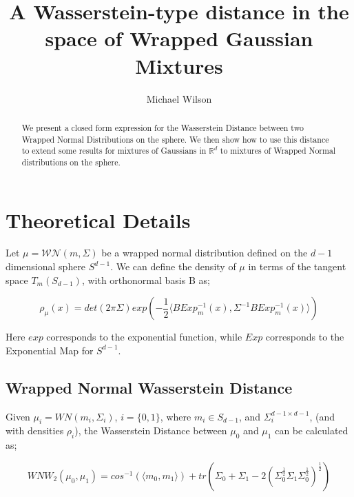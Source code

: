 \documentclass[]{article}
\title{A Wasserstein-type distance in the space of Wrapped Gaussian Mixtures}
\author{Michael Wilson}
\date{}
\begin{document}
	
	\maketitle
	
	\begin{abstract}
	We present a closed form expression for the Wasserstein Distance between two Wrapped Normal Distributions on the sphere. We then show how to use this distance to extend some results for mixtures of Gaussians in $\mathbb{R}^d$ to mixtures of Wrapped Normal distributions on the sphere.  
	\end{abstract}


\section{Theoretical Details}

Let $\mu = \mathcal{WN}(m,\Sigma)$ be a wrapped normal distribution defined on the $d-1$ dimensional sphere $S^{d-1}$. We can define the density of $\mu$ in terms of the tangent space $T_m(S_{d-1})$, with orthonormal basis B as; 

\begin{equation*}
	\rho_\mu(x) = det(2 \pi \Sigma) exp(-\frac{1}{2} \langle B Exp_m^{-1}(x), \Sigma^{-1} B Exp_m^{-1}(x) \rangle) 
\end{equation*}

Here $exp$ corresponds to the exponential function, while $Exp$ corresponds to the Exponential Map for $S^{d-1}$.

\subsection{Wrapped Normal Wasserstein Distance}

Given $\mu_i = WN(m_i,\Sigma_i)$, $i = \{0,1\}$, where $m_i \in S_{d-1}$, and $\Sigma_i^{d-1 \times d-1}$, (and with densities $\rho_i$), the Wasserstein Distance between $\mu_0$ and $\mu_1$ can be calculated as;

\begin{equation}\label{eq: wrapped normal wasserstein}
	WNW_2(\mu_0, \mu_1) = cos^{-1}(\langle m_0, m_1 \rangle) + tr(\Sigma_0 + \Sigma_1 - 2(\Sigma_0^{\frac{1}{2}}\Sigma_1\Sigma_0^{\frac{1}{2}})^{\frac{1}{2}})
\end{equation} 
\end{document}
